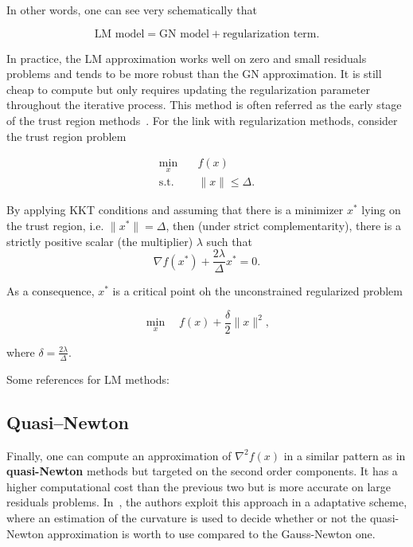 \documentclass[10pt]{article}
\numberwithin{equation}{section}
\begin{document}
	 In other words, one can see very schematically that
	 
	\[\text{LM model} = \text{GN model} + \text{regularization term}.\]
	
	In practice, the LM approximation works well on zero and small residuals problems and tends to be more robust than the GN approximation. It is still cheap to compute but only requires updating the regularization parameter throughout the iterative process. This method is often referred as the early stage of the trust region methods~\cite{conn-etal:2000}. For the link with regularization methods, consider the trust region problem
	 
	 \begin{equation*}
	 	\begin{aligned}
	 		\min_x \quad & f(x) \\
	 		\text{s.t.} \quad & \|x\| \le \Delta.
	 	\end{aligned}
	 \end{equation*}
	 
	 By applying KKT conditions and assuming that there is a minimizer $x^*$ lying on the trust region, i.e. $\|x^*\|=\Delta$, then (under strict complementarity), there is a strictly positive scalar (the multiplier) $\lambda$ such that
	 \[\nabla f(x^*) + \dfrac{2\lambda}{\Delta}x^*=0.\]
	 
	 As a consequence, $x^*$ is a critical point oh the unconstrained regularized problem
	 
	 \[\min_x \quad f(x) + \dfrac{\delta}{2} \|x\|^2,\]
	 
	 where $\delta=\frac{2\lambda}{\Delta}$.
	 
	 Some references for LM methods: \cite{bellavia-etal:2018}
	 
	 \subsection{Quasi--Newton}
	 
	 Finally, one can compute an approximation of $\nabla^2f(x)$ in a similar pattern as in \textbf{quasi-Newton} methods \cite[][Chapter 6]{nocedalwright:2006} but targeted on the second order components. It has a higher computational cost than the previous two but is more accurate on large residuals problems. In~\cite{dennisetal:1981}, the authors exploit this approach in a adaptative scheme, where an estimation of the curvature is used to decide whether or not the quasi-Newton approximation is worth to use compared to the Gauss-Newton one.
	 
\end{document}
